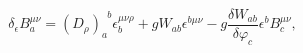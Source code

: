 \begin{equation}
\delta _{\epsilon }B_{a}^{\mu \nu }=\left( D_{\rho }\right)
_{a}^{\;\;b}\epsilon _{b}^{\mu \nu \rho }+gW_{ab}\epsilon ^{b\mu \nu }-g%
\frac{\delta W_{ab}}{\delta \varphi _{c}}\epsilon ^{b}B_{c}^{\mu \nu },
\label{i44}
\end{equation}

